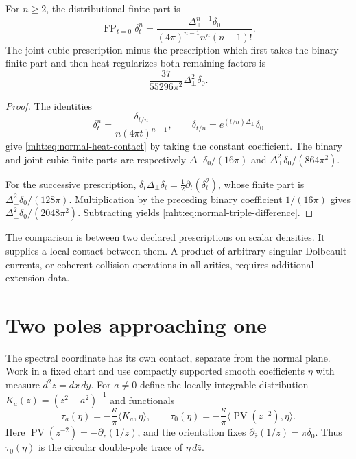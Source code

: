 \begin{proposition}\label{mht:prop:normal-heat-contact}
For $n\geq2$, the distributional finite part is
\begin{equation}\label{mht:eq:normal-heat-contact}
 \operatorname{FP}_{t=0}\delta_t^n
   =\frac{\Delta_\perp^{n-1}\delta_0}
          {(4\pi)^{n-1}n^n(n-1)!}.
\end{equation}
The joint cubic prescription minus the prescription which
first takes the binary finite part and then heat-regularizes
both remaining factors is
\begin{equation}\label{mht:eq:normal-triple-difference}
 \frac{37}{55296\pi^2}\Delta_\perp^2\delta_0.
\end{equation}
\end{proposition}

\begin{proof}
The identities
\[
 \delta_t^n=\frac{\delta_{t/n}}{n(4\pi t)^{n-1}},
 \qquad \delta_{t/n}=e^{(t/n)\Delta_\perp}\delta_0
\]
give \eqref{mht:eq:normal-heat-contact} by taking the constant
coefficient.
The binary and joint cubic finite parts are respectively
$\Delta_\perp\delta_0/(16\pi)$ and
$\Delta_\perp^2\delta_0/(864\pi^2)$.

For the successive prescription,
$\delta_t\Delta_\perp\delta_t=\frac12\partial_t(\delta_t^2)$,
whose finite part is $\Delta_\perp^2\delta_0/(128\pi)$.
Multiplication by the preceding binary coefficient $1/(16\pi)$
gives $\Delta_\perp^2\delta_0/(2048\pi^2)$. Subtracting yields
\eqref{mht:eq:normal-triple-difference}.
\end{proof}

The comparison is between two declared prescriptions on scalar
densities. It supplies a local contact between them. A product
of arbitrary singular Dolbeault currents, or coherent collision
operations in all arities, requires additional extension data.

\section{Two poles approaching one}

The spectral coordinate has its own contact, separate from
the normal plane. Work in a fixed chart and use compactly
supported smooth coefficients $\eta$ with measure $d^2z=dx\,dy$.
For $a\ne0$ define the locally integrable distribution
$K_a(z)=(z^2-a^2)^{-1}$ and functionals
\[
 \tau_a(\eta)=-\frac\kappa\pi\langle K_a,\eta\rangle,
 \qquad
 \tau_0(\eta)=-\frac\kappa\pi
       \langle\operatorname{PV}(z^{-2}),\eta\rangle.
\]
Here $\operatorname{PV}(z^{-2})=-\partial_z(1/z)$, and the
orientation fixes $\partial_{\bar z}(1/z)=\pi\delta_0$.
Thus $\tau_0(\eta)$ is the circular double-pole trace of
$\eta\,d\bar z$.

